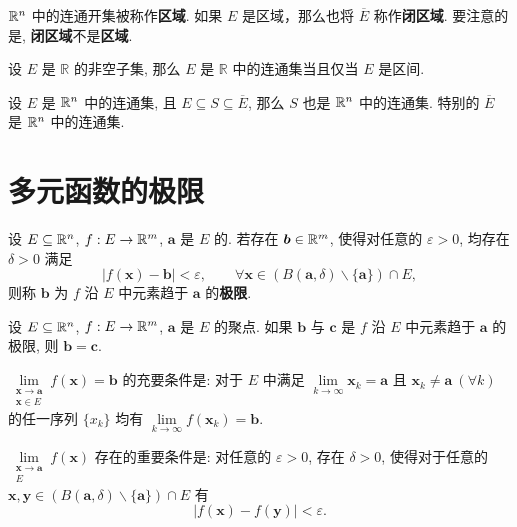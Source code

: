 \begin{definition}[区域、闭区域]\label{区域}\label{闭区域}\label{有界闭区域}
	$\mathbb {R}^{n}$ 中的连通开集被称作\textbf{区域}.
	如果 $E$ 是区域，那么也将 $\overline{E}$ 称作\textbf{闭区域}. 要注意的是, \textbf{闭区域}不是\textbf{区域}.
\end{definition}

\begin{proposition}
	设 $E$ 是 $\mathbb R$ 的非空子集, 那么 $E$ 是 $\mathbb R$ 中的连通集当且仅当 $E$ 是区间.
\end{proposition}

\begin{proposition}
	设 $E$ 是 $\mathbb {R}^{n}$ 中的连通集, 且 $E \subseteq S \subseteq \overline{E}$, 那么 $S$ 也是 $\mathbb {R}^{n}$ 中的连通集. 特别的 $\overline{E}$ 是 $\mathbb {R}^{n}$ 中的连通集.
\end{proposition}

\section{多元函数的极限}

\begin{definition}[极限]\label{多元极限}
	设 $E \subseteq \mathbb {R}^{n}$, $f:E \to \mathbb {R}^{m}$, $\bm a $ 是 $E$ 的. 若存在 $\bm b\in \mathbb {R}^{m}$, 使得对任意的 $\varepsilon>0$, 均存在 $\delta>0$ 满足
	$$|f(\bm x)-\bm b|<\varepsilon, \qquad \forall \bm x \in (B(\bm a,\delta)\backslash \{\bm a\})\cap E,$$
	则称 $\bm b$ 为 $f$ 沿 $E$ 中元素趋于 $\bm a$ 的\textbf{极限}.
\end{definition}

\begin{proposition}[极限的唯一性]
	设 $E \subseteq \mathbb {R}^{n}$, $f:E\to \mathbb {R}^{m}$, $\bm a$ 是 $E$ 的聚点. 如果 $\bm b$ 与 $\bm c$ 是 $f$ 沿 $E$ 中元素趋于 $\bm a$ 的极限, 则 $\bm b=\bm c$.
\end{proposition}

\begin{theorem}[海涅归结原理]\label{多元海涅归结原理}
	$\lim\limits_{\substack{\bm x \to \bm a \\ \bm x \in E}}f(\bm x)=\bm b$ 的充要条件是: 对于 $E$ 中满足 $\lim\limits_{k \to \infty} \bm x_k=\bm a$ 且 $\bm x_k \neq \bm a\ (\forall k)$ 的任一序列 $\{x_k\}$ 均有 $\lim\limits_{k\to \infty}f(\bm x_k)=\bm b$.
\end{theorem}

\begin{theorem}[柯西收敛准则]
	$\lim\limits_{\substack{\bm x \to \bm a \\ E}}f(\bm x)$ 存在的重要条件是: 对任意的 $\varepsilon>0$, 存在 $\delta>0$, 使得对于任意的 $\bm x,\bm y\in (B(\bm a,\delta)\backslash\{\bm a\})\cap E$ 有
	$$|f(\bm x)-f(\bm y)|<\varepsilon.$$
\end{theorem}

